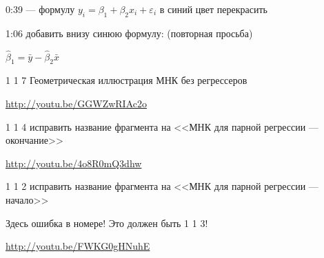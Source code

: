 \documentclass[12pt,a4paper]{article}
\begin{document}
0:39 --- формулу $y_i=\beta_1 +\beta_2 x_i + \varepsilon_i$ в синий цвет перекрасить

1:06 добавить внизу синюю формулу:  (повторная просьба)

$\hat{\beta}_1=\bar{y}-\hat{\beta}_2 \bar{x}$

1 1 7 Геометрическая иллюстрация МНК без регрессеров

\url{http://youtu.be/GGWZwRIAc2o}

1 1 4 исправить название фрагмента на <<МНК для парной регрессии  --- окончание>>

\url{http://youtu.be/4o8R0mQ3dhw}

1 1 2 исправить название фрагмента на  <<МНК для парной регрессии --- начало>>

Здесь ошибка в номере! Это должен быть 1 1 3!

\url{http://youtu.be/FWKG0gHNuhE}

 
\end{document}
